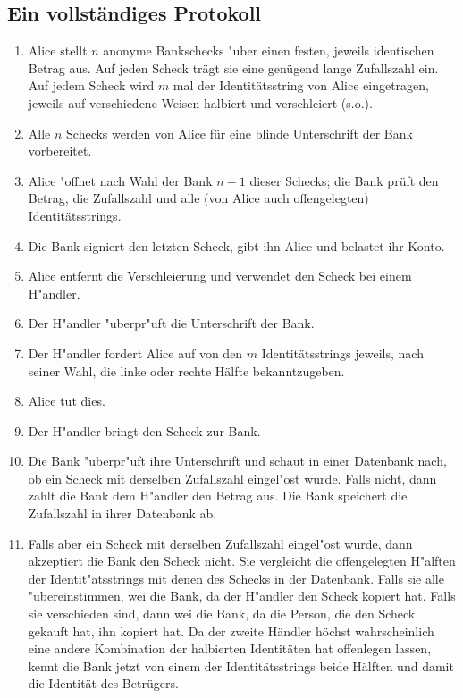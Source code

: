 \subsection{Ein vollst\"andiges Protokoll}

\begin{enumerate}
  \item Alice stellt $n$ anonyme Bankschecks "uber einen festen,
        jeweils identischen Betrag aus. Auf jeden Scheck tr\"agt sie
        eine gen\"ugend lange Zufallszahl ein.
        Auf jedem Scheck wird $m$ mal der Identit\"atsstring von
        Alice eingetragen, jeweils auf verschiedene Weisen halbiert 
        und verschleiert (s.o.).
  \item Alle $n$ Schecks werden von Alice f\"ur eine blinde
        Unterschrift der Bank vorbereitet.
  \item Alice "offnet nach Wahl der Bank $n-1$ dieser Schecks;
        die Bank pr\"uft den Betrag, die Zufallszahl und alle (von Alice
        auch offengelegten) Identit\"atsstrings.
  \item Die Bank signiert den letzten Scheck, gibt ihn Alice und belastet
        ihr Konto.
  \item Alice entfernt die Verschleierung und verwendet den Scheck bei einem
        H"andler.
  \item Der H"andler "uberpr"uft die Unterschrift der Bank.
  \item Der H"andler fordert Alice auf von den $m$ Identit\"atsstrings
        jeweils, nach seiner Wahl, die linke oder rechte H\"alfte bekanntzugeben.
  \item Alice tut dies.
  \item Der H"andler bringt den Scheck zur Bank.
  \item Die Bank "uberpr"uft ihre Unterschrift und schaut in einer
        Datenbank nach, ob ein Scheck mit derselben Zufallszahl
        eingel"ost wurde. Falls nicht, dann zahlt die Bank dem
        H"andler den Betrag aus. Die Bank speichert die Zufallszahl in
        ihrer Datenbank ab.
  \item Falls aber ein Scheck mit derselben Zufallszahl eingel"ost
        wurde, dann akzeptiert die Bank den Scheck nicht. Sie
        vergleicht die offengelegten H"alften der Identit"atsstrings 
        mit denen des Schecks in der Datenbank. Falls sie alle "ubereinstimmen, 
        wei\3 die Bank, da\3 der
        H"andler den Scheck kopiert hat. Falls sie verschieden sind,
        dann wei\3 die Bank, da\3 die Person, die den Scheck gekauft
        hat, ihn kopiert hat.
        Da der zweite H\"andler h\"ochst wahrscheinlich eine andere 
        Kombination der halbierten Identit\"aten hat offenlegen lassen,
        kennt die Bank jetzt von einem der Identit\"atsstrings beide 
        H\"alften und damit die Identit\"at des Betr\"ugers.
\end{enumerate}


  